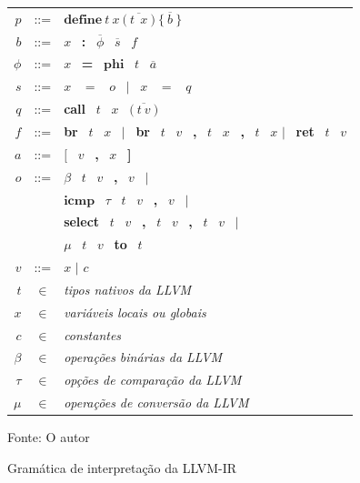 \begin{figure}[h]
\begin{center}
\large
\begin{tabular}{r@{\ \ }c@{\ \ }l}
    $p$ & ::= & $\textbf{define} \ t \ x \ \textbf{(} \ \overline{t \ \ x} \ \textbf{)}\ \textbf{\{}\ \overline{b}\ \textbf{\}}$ \\
    $b$ & ::= & $x$ \ \textbf{:} \ $\overline{\phi}$ \ $\overline{s}$ \ $f$ \\
    $\phi$ & ::= & $x$ \ \textbf{=} \ $\textbf{phi}$ \ $t$ \ $\overline{a}$ \\
    $s$ & ::= & $x$ \ $\boldsymbol{=}$ \ $o$ \ $|$ \ $x$ \ $\boldsymbol{=}$ \ $q$ \\
    $q$ & ::= & \textbf{call} \ $t$ \ $x$ \ $\textbf{(} \ \overline{t \ v} \ \textbf{)}$ \\
    $f$ & ::= & \textbf{br} \ $t$ \ $x$ \ $|$ \ \textbf{br} \ $t$ \ $v$ \ \textbf{,} \ $t$ \ $x$ \ \textbf{,} \ $t$ \ $x$ $|$ \ \textbf{ret} \ $t$ \ $v$ \\
    $a$ & ::= & $\textbf{[}$ \ $v$ \ \textbf{,} \ $x$ \ \textbf{]} \\
    $o$ & ::= & $\beta$ \ $t$ \ $v$ \ \textbf{,} \ $v$ \ $|$ \\ 
    & & $\mathbf{icmp}$ \ $\tau$ \ $t$ \ $v$ \ \textbf{,} \ $v$ \ $|$ \\
    & & \textbf{select} \ $t$ \ $v$ \ \textbf{,} \ $t$ \ $v$ \ \textbf{,} \ $t$ \ $v$ \ $|$  \\ 
    & & $\mu$ \ $t$ \ $v$ \ \textbf{to} \ $t$ \\
    $v$ & ::= & $x$ $|$ $c$ \\
    $t$ & $\in$ & \emph{tipos nativos da LLVM}  \\
    $x$ & $\in$ & \emph{variáveis locais ou globais} \\
    $c$ & $\in$ & \emph{constantes} \\
    $\beta$ & $\in$ & \emph{operações binárias da LLVM} \\
    $\tau$ & $\in$ & \emph{opções de comparação da LLVM} \\
    $\mu$ & $\in$ & \emph{operações de conversão da LLVM} \\
\end{tabular}
\caption{Gramática de interpretação da LLVM-IR}
\label{fig:llvm-ir-gramatica}
\small{Fonte: O autor}
\end{center}
\end{figure}

